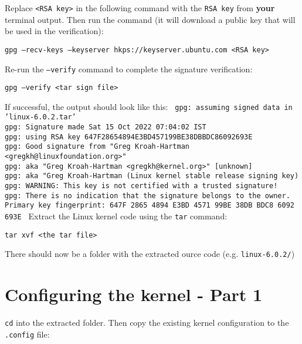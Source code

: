 \documentclass[12pt,a4paper]{report}
\begin{document}
\newline
\newline
Replace \texttt{<RSA key>} in the following command with the \texttt{RSA key} from \textbf{your} terminal output. Then run the command (it will download a public key that will be used in the verification):
\newline
\newline
\centerline{\texttt{\small gpg --recv-keys --keyserver hkps://keyserver.ubuntu.com <RSA key>}}
\newline
\newline 
Re-run the \texttt{--verify} command to complete the signature verification:
\newline
\newline
\centerline{\texttt{gpg --verify <tar sign file>}}
\newline
\newline
If successful, the output should look like this:
\newline
\newline
\texttt{\footnotesize
gpg: assuming signed data in 'linux-6.0.2.tar'
\\
gpg: Signature made Sat 15 Oct 2022 07:04:02 IST
\\
gpg:                using RSA key 647F28654894E3BD457199BE38DBBDC86092693E
\\
gpg: Good signature from "Greg Kroah-Hartman <gregkh@linuxfoundation.org>"
\\
gpg:                 aka "Greg Kroah-Hartman <gregkh@kernel.org>" [unknown]
\\
gpg:                 aka "Greg Kroah-Hartman (Linux kernel stable release signing key)
\\
gpg: WARNING: This key is not certified with a trusted signature!
\\
gpg:          There is no indication that the signature belongs to the owner.
\\
Primary key fingerprint: 647F 2865 4894 E3BD 4571  99BE 38DB BDC8 6092 693E
}
\newline
\newline
Extract the Linux kernel code using the \texttt{tar} command:
\newline
\newline
\centerline{\texttt{tar xvf <the tar file>}}
\newline
\newline
There should now be a folder with the extracted ource code (e.g. \texttt{linux-6.0.2/}) 

\section{Configuring the kernel - Part 1}
\texttt{cd} into the extracted folder. Then copy the existing kernel configuration to the \texttt{.config} file:
\end{document}
